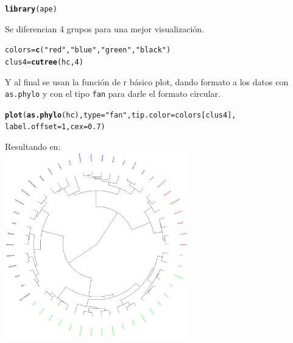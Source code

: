 \documentclass{article}\usepackage[]{graphicx}\usepackage[]{color}
\makeatletter
\newcommand{\hlnum}[1]{\textcolor[rgb]{0.686,0.059,0.569}{#1}}%
\newcommand{\hlstr}[1]{\textcolor[rgb]{0.192,0.494,0.8}{#1}}%
\newcommand{\hlstd}[1]{\textcolor[rgb]{0.345,0.345,0.345}{#1}}%
\newcommand{\hlkwb}[1]{\textcolor[rgb]{0.69,0.353,0.396}{#1}}%
\newcommand{\hlkwc}[1]{\textcolor[rgb]{0.333,0.667,0.333}{#1}}%
\newcommand{\hlkwd}[1]{\textcolor[rgb]{0.737,0.353,0.396}{\textbf{#1}}}%
\newenvironment{kframe}{%
 \def\at@end@of@kframe{}%
 \ifinner\ifhmode%
  \def\at@end@of@kframe{\end{minipage}}%
  \begin{minipage}{\columnwidth}%
 \fi\fi%
 \def\FrameCommand##1{\hskip\@totalleftmargin \hskip-\fboxsep
 \colorbox{shadecolor}{##1}\hskip-\fboxsep
     \hskip-\linewidth \hskip-\@totalleftmargin \hskip\columnwidth}%
 \MakeFramed {\advance\hsize-\width
   \@totalleftmargin\z@ \linewidth\hsize
   \@setminipage}}%
 {\par\unskip\endMakeFramed%
 \at@end@of@kframe}
\newenvironment{knitrout}{}{} %
\makeatother
\begin{document}
\begin{knitrout}
\color{fgcolor}\begin{kframe}
\begin{alltt}
\hlkwd{library}\hlstd{(ape)}
\end{alltt}
\end{kframe}
\end{knitrout}
Se diferencian 4 grupos para una mejor visualizaci\'on.
\begin{knitrout}
\color{fgcolor}\begin{kframe}
\begin{alltt}
\hlstd{colors} \hlkwb{=} \hlkwd{c}\hlstd{(}\hlstr{"red"}\hlstd{,} \hlstr{"blue"}\hlstd{,} \hlstr{"green"}\hlstd{,} \hlstr{"black"}\hlstd{)}
\hlstd{clus4} \hlkwb{=} \hlkwd{cutree}\hlstd{(hc,} \hlnum{4}\hlstd{)}
\end{alltt}
\end{kframe}
\end{knitrout}
Y al final se usan la funci\'on de r b\'asico plot, dando formato a los datos con \texttt{as.phylo} y con el tipo \texttt{fan} para darle el formato circular.
\begin{knitrout}
\color{fgcolor}\begin{kframe}
\begin{alltt}
\hlkwd{plot}\hlstd{(}\hlkwd{as.phylo}\hlstd{(hc),} \hlkwc{type} \hlstd{=} \hlstr{"fan"}\hlstd{,} \hlkwc{tip.color} \hlstd{= colors[clus4],}
     \hlkwc{label.offset} \hlstd{=} \hlnum{1}\hlstd{,} \hlkwc{cex} \hlstd{=} \hlnum{0.7}\hlstd{)}
\end{alltt}
\end{kframe}
\end{knitrout}
Resultando en:~\\
\vbox{
    \centering
    \includegraphics[width=0.6\textwidth]{imag/ape}
}
\end{document}
